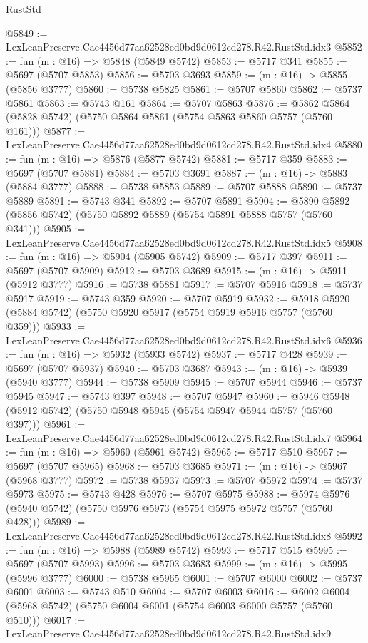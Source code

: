 \begin{lexlean}{RustStd}
\begin{coremodule}
@5849 := LexLeanPreserve.Cae4456d77aa62528ed0bd9d0612cd278.R42.RustStd.idx3
@5852 := fun (m : @16) => @5848 (@5849 @5742)
@5853 := @5717 @341
@5855 := @5697 (@5707 @5853)
@5856 := @5703 @3693
@5859 := (m : @16) -> @5855 (@5856 @3777)
@5860 := @5738 @5825
@5861 := @5707 @5860
@5862 := @5737 @5861
@5863 := @5743 @161
@5864 := @5707 @5863
@5876 := @5862 @5864 (@5828 @5742) (@5750 @5864 @5861 (@5754 @5863 @5860 @5757 (@5760 @161)))
@5877 := LexLeanPreserve.Cae4456d77aa62528ed0bd9d0612cd278.R42.RustStd.idx4
@5880 := fun (m : @16) => @5876 (@5877 @5742)
@5881 := @5717 @359
@5883 := @5697 (@5707 @5881)
@5884 := @5703 @3691
@5887 := (m : @16) -> @5883 (@5884 @3777)
@5888 := @5738 @5853
@5889 := @5707 @5888
@5890 := @5737 @5889
@5891 := @5743 @341
@5892 := @5707 @5891
@5904 := @5890 @5892 (@5856 @5742) (@5750 @5892 @5889 (@5754 @5891 @5888 @5757 (@5760 @341)))
@5905 := LexLeanPreserve.Cae4456d77aa62528ed0bd9d0612cd278.R42.RustStd.idx5
@5908 := fun (m : @16) => @5904 (@5905 @5742)
@5909 := @5717 @397
@5911 := @5697 (@5707 @5909)
@5912 := @5703 @3689
@5915 := (m : @16) -> @5911 (@5912 @3777)
@5916 := @5738 @5881
@5917 := @5707 @5916
@5918 := @5737 @5917
@5919 := @5743 @359
@5920 := @5707 @5919
@5932 := @5918 @5920 (@5884 @5742) (@5750 @5920 @5917 (@5754 @5919 @5916 @5757 (@5760 @359)))
@5933 := LexLeanPreserve.Cae4456d77aa62528ed0bd9d0612cd278.R42.RustStd.idx6
@5936 := fun (m : @16) => @5932 (@5933 @5742)
@5937 := @5717 @428
@5939 := @5697 (@5707 @5937)
@5940 := @5703 @3687
@5943 := (m : @16) -> @5939 (@5940 @3777)
@5944 := @5738 @5909
@5945 := @5707 @5944
@5946 := @5737 @5945
@5947 := @5743 @397
@5948 := @5707 @5947
@5960 := @5946 @5948 (@5912 @5742) (@5750 @5948 @5945 (@5754 @5947 @5944 @5757 (@5760 @397)))
@5961 := LexLeanPreserve.Cae4456d77aa62528ed0bd9d0612cd278.R42.RustStd.idx7
@5964 := fun (m : @16) => @5960 (@5961 @5742)
@5965 := @5717 @510
@5967 := @5697 (@5707 @5965)
@5968 := @5703 @3685
@5971 := (m : @16) -> @5967 (@5968 @3777)
@5972 := @5738 @5937
@5973 := @5707 @5972
@5974 := @5737 @5973
@5975 := @5743 @428
@5976 := @5707 @5975
@5988 := @5974 @5976 (@5940 @5742) (@5750 @5976 @5973 (@5754 @5975 @5972 @5757 (@5760 @428)))
@5989 := LexLeanPreserve.Cae4456d77aa62528ed0bd9d0612cd278.R42.RustStd.idx8
@5992 := fun (m : @16) => @5988 (@5989 @5742)
@5993 := @5717 @515
@5995 := @5697 (@5707 @5993)
@5996 := @5703 @3683
@5999 := (m : @16) -> @5995 (@5996 @3777)
@6000 := @5738 @5965
@6001 := @5707 @6000
@6002 := @5737 @6001
@6003 := @5743 @510
@6004 := @5707 @6003
@6016 := @6002 @6004 (@5968 @5742) (@5750 @6004 @6001 (@5754 @6003 @6000 @5757 (@5760 @510)))
@6017 := LexLeanPreserve.Cae4456d77aa62528ed0bd9d0612cd278.R42.RustStd.idx9

\end{coremodule}
\end{lexlean}
